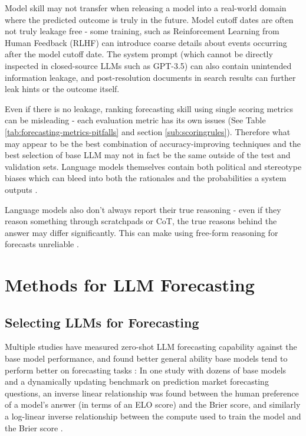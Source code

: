 \documentclass[12pt,a4paper]{article}
\begin{document}
Model skill may not transfer when releasing a model into a real-world domain where the predicted outcome is truly in the future. Model cutoff dates are often not truly leakage free - some training, such as Reinforcement Learning from Human Feedback (RLHF) can introduce coarse details about events occurring after the model cutoff date. The system prompt (which cannot be directly inspected in closed-source LLMs such as GPT-3.5) can also contain unintended information leakage, and post-resolution documents in search results can further leak hints or the outcome itself.

Even if there is no leakage, ranking forecasting skill using single scoring metrics can be misleading - each evaluation metric has its own issues  (See Table \ref{tab:forecasting-metrics-pitfalls} and section \ref{sub:scoringrules}). Therefore what may appear to be the best combination of accuracy-improving techniques and the best selection of base LLM may not in fact be the same outside of the test and validation sets.  Language models themselves contain both political and stereotype biases which can bleed into both the rationales and the probabilities a system outputs  . 

Language models also don't always report their true reasoning  - even if they reason something through scratchpads or CoT, the true reasons behind the answer may differ significantly. This can make using free-form reasoning for forecasts unreliable . 


\clearpage
\section{Methods for LLM Forecasting}
\subsection{Selecting LLMs for Forecasting \DOMAINCAPITALIZEDINTERVENTIONTWO}
Multiple studies have measured zero-shot LLM forecasting capability against the base model performance, and found better general ability base models tend to perform better on forecasting tasks  : In one study with dozens of base models and a dynamically updating benchmark on prediction market forecasting questions, an inverse linear relationship was found between the human preference of a model's answer (in terms of an ELO score) and the Brier score, and similarly a log-linear inverse relationship between the compute used to train the model and the Brier score .
\end{document}
